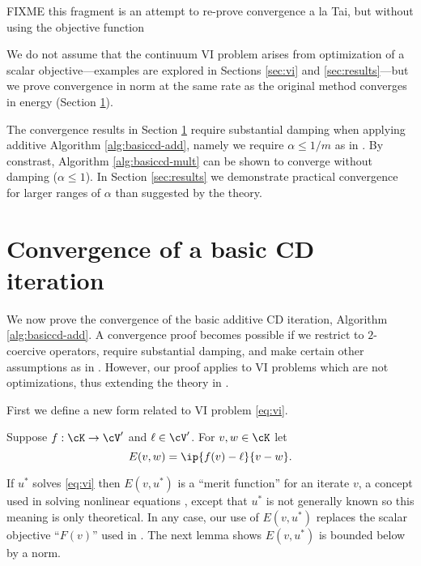 FIXME this fragment is an attempt to re-prove convergence a la Tai, but without using the objective function

We do not assume that the continuum VI problem arises from optimization of a scalar objective---examples are explored in Sections \ref{sec:vi} and \ref{sec:results}---but we prove convergence in norm at the same rate as the original method converges in energy (Section \ref{sec:convergence}). %

The convergence results in Section \ref{sec:convergence} require substantial damping when applying additive Algorithm \ref{alg:basiccd-add}, namely we require $\alpha \le 1/m$ as in \cite{Tai2003}.  By constrast, Algorithm \ref{alg:basiccd-mult} can be shown to converge without damping ($\alpha\le 1$).  In Section \ref{sec:results} we demonstrate practical convergence for larger ranges of $\alpha$ than suggested by the theory.



\section{Convergence of a basic CD iteration} \label{sec:convergence}

We now prove the convergence of the basic additive CD iteration, Algorithm \ref{alg:basiccd-add}. %
A convergence proof becomes possible if we restrict to $2$-coercive operators, require substantial damping, and make certain other assumptions as in \cite{Tai2003}.  However, our proof applies to VI problems which are not optimizations, thus extending the theory in \cite{Tai2003}.

First we define a new form related to VI problem \eqref{eq:vi}.

\begin{definition} Suppose $f:\cK \to \cV'$ and $\ell \in \cV'$.  For $v,w \in \cK$ let
\begin{equation}
  E(v,w) = \ip{f(v)-\ell}{v-w}.  \label{eq:normlikedefn}
\end{equation}
\end{definition}

If $u^*$ solves \eqref{eq:vi} then $E(v,u^*)$ is a ``merit function'' for an iterate $v$, a concept used in solving nonlinear equations \cite{NocedalWright2006}, except that $u^*$ is not generally known so this meaning is only theoretical.  In any case, our use of $E(v,u^*)$ replaces the scalar objective ``$F(v)$'' used in \cite{Tai2003}.  The next lemma shows $E(v,u^*)$ is bounded below by a norm.

